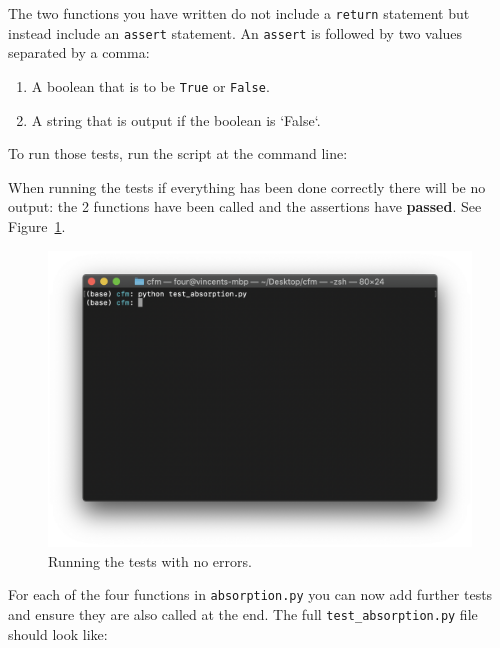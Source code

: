 \begin{note}
The two functions you have written do not include a \texttt{return} statement but
instead include an \texttt{assert} statement. An \texttt{assert} is followed by two values
separated by a comma:
\begin{enumerate}

\item 

A boolean that is to be \texttt{True} or \texttt{False}.

\item 

A string that is output if the boolean is `False`.

\end{enumerate}
\end{note}



To run those tests, run the script at the command line:



When running the tests if everything has been done correctly there will be no
output: the 2 functions have been called and the assertions have
\textbf{passed}. See Figure~\ref{fig:running_tests_with_no_errors}.

\begin{figure}[htbp]
\centering

\includegraphics[width=0.750\linewidth]{./assets/running_tests_with_no_errors/main.png}
\caption{Running the tests with no errors.}
\label{fig:running_tests_with_no_errors}
\end{figure}


For each of the four functions in \texttt{absorption.py} you can now add further tests
and ensure they are also called at the end. The full \texttt{test\_absorption.py} file
should look like:

